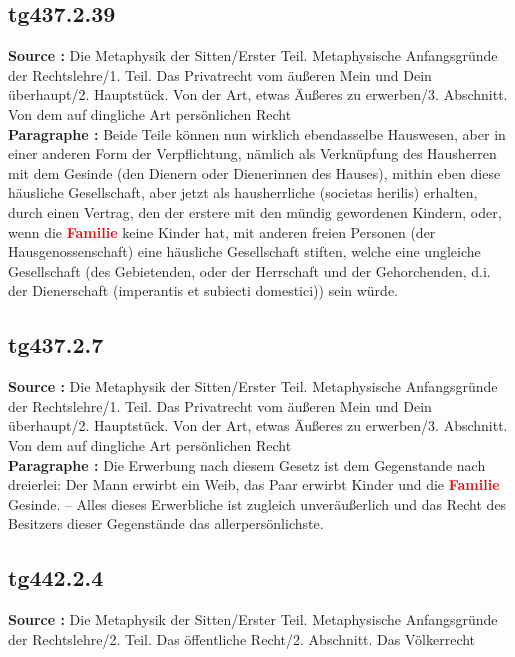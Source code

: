 \documentclass[a4paper,12pt,twoside]{book}
\newcommand{\match}[1]{\textcolor{red}{\textbf{#1}}}
\begin{document}
	\subsection*{tg437.2.39} 
	\textbf{Source : }Die Metaphysik der Sitten/Erster Teil. Metaphysische Anfangsgründe der Rechtslehre/1. Teil. Das Privatrecht vom äußeren Mein und Dein überhaupt/2. Hauptstück. Von der Art, etwas Äußeres zu erwerben/3. Abschnitt. Von dem auf dingliche Art persönlichen Recht\\  
	
	\textbf{Paragraphe : }Beide Teile können nun wirklich ebendasselbe Hauswesen, aber in einer anderen Form der Verpflichtung, nämlich als Verknüpfung des Hausherren mit dem Gesinde (den Dienern oder Dienerinnen des Hauses), mithin eben diese häusliche Gesellschaft, aber jetzt als hausherrliche (societas herilis) erhalten, durch einen Vertrag, den der erstere mit den mündig gewordenen Kindern, oder, wenn die \match{Familie} keine Kinder hat, mit anderen freien Personen (der Hausgenossenschaft) eine häusliche Gesellschaft stiften, welche eine ungleiche Gesellschaft (des Gebietenden, oder der Herrschaft und der Gehorchenden, d.i. der Dienerschaft (imperantis et subiecti domestici)) sein würde. 
	
	\subsection*{tg437.2.7} 
	\textbf{Source : }Die Metaphysik der Sitten/Erster Teil. Metaphysische Anfangsgründe der Rechtslehre/1. Teil. Das Privatrecht vom äußeren Mein und Dein überhaupt/2. Hauptstück. Von der Art, etwas Äußeres zu erwerben/3. Abschnitt. Von dem auf dingliche Art persönlichen Recht\\  
	
	\textbf{Paragraphe : }Die Erwerbung nach diesem Gesetz ist dem Gegenstande nach dreierlei: Der Mann erwirbt ein Weib, das Paar erwirbt Kinder und die \match{Familie} Gesinde. – Alles dieses Erwerbliche ist zugleich unveräußerlich und das Recht des Besitzers dieser Gegenstände das allerpersönlichste. 
	
	\subsection*{tg442.2.4} 
	\textbf{Source : }Die Metaphysik der Sitten/Erster Teil. Metaphysische Anfangsgründe der Rechtslehre/2. Teil. Das öffentliche Recht/2. Abschnitt. Das Völkerrecht\\  
	
\end{document}
